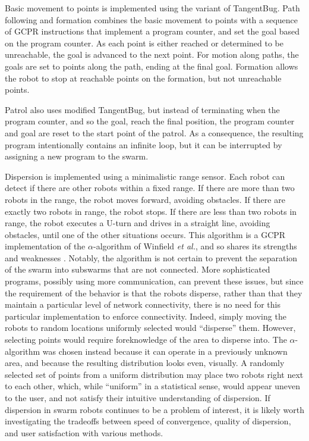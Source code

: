 Basic movement to points is implemented using the variant of TangentBug. 
Path following and formation combines the basic movement to points with a sequence of GCPR instructions that implement a program counter, and set the goal based on the program counter. 
As each point is either reached or determined to be unreachable, the goal is advanced to the next point.
For motion along paths, the goals are set to points along the path, ending at the final goal. 
Formation allows the robot to stop at reachable points on the formation, but not unreachable points.  

Patrol also uses modified TangentBug, but instead of terminating when the program counter, and so the goal, reach the final position, the program counter and goal are reset to the start point of the patrol.  
As a consequence, the resulting program intentionally contains an infinite loop, but it can be interrupted by assigning a new program to the swarm. 

Dispersion is implemented using a minimalistic range sensor. 
Each robot can detect if there are other robots within a fixed range. 
If there are more than two robots in the range, the robot moves forward, avoiding obstacles. 
If there are exactly two robots in range, the robot stops. If there are less than two robots in range, the robot executes a U-turn and drives in a straight line, avoiding obstacles, until one of the other situations occurs. 
This algorithm is a GCPR implementation of the $\alpha$-algorithm of Winfield \emph{et al.}, and so shares its strengths and weaknesses  \citep{winfield2008modelling}.
Notably, the algorithm is not certain to prevent the separation of the swarm into subswarms that are not connected. 
More sophisticated programs, possibly using more communication, can prevent these issues, but since the requirement of the behavior is that the robots disperse, rather than that they maintain a particular level of network connectivity, there is no need for this particular implementation to enforce connectivity. 
Indeed, simply moving the robots to random locations uniformly selected would ``disperse'' them. 
However, selecting points would require foreknowledge of the area to disperse into. 
The $\alpha$-algorithm was chosen instead because it can operate in a previously unknown area, and because the resulting distribution looks even, visually. 
A randomly selected set of points from a uniform distribution may place two robots right next to each other, which, while ``uniform'' in a statistical sense, would appear uneven to the user, and not satisfy their intuitive understanding of dispersion. 
If dispersion in swarm robots continues to be a problem of interest, it is likely worth investigating the tradeoffs between speed of convergence, quality of dispersion, and user satisfaction with various methods. 

